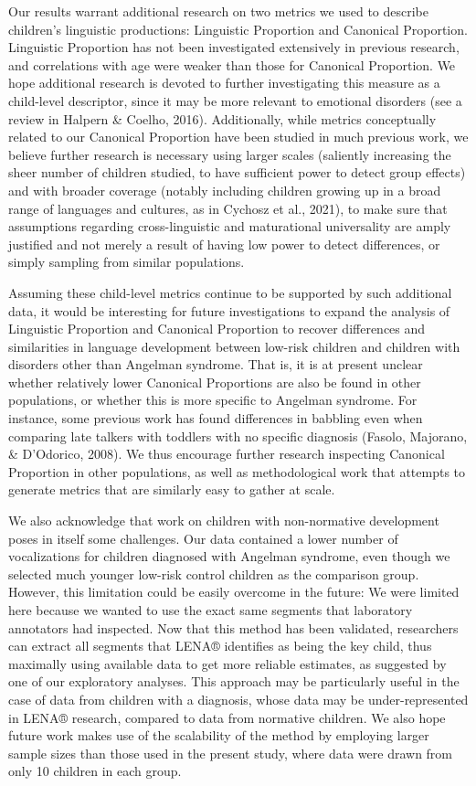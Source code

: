 \documentclass[
  english,
  ,man]{apa6}
\begin{document}
Our results warrant additional research on two metrics we used to describe children's linguistic productions: Linguistic Proportion and Canonical Proportion. Linguistic Proportion has not been investigated extensively in previous research, and correlations with age were weaker than those for Canonical Proportion. We hope additional research is devoted to further investigating this measure as a child-level descriptor, since it may be more relevant to emotional disorders (see a review in Halpern \& Coelho, 2016). Additionally, while metrics conceptually related to our Canonical Proportion have been studied in much previous work, we believe further research is necessary using larger scales (saliently increasing the sheer number of children studied, to have sufficient power to detect group effects) and with broader coverage (notably including children growing up in a broad range of languages and cultures, as in Cychosz et al., 2021), to make sure that assumptions regarding cross-linguistic and maturational universality are amply justified and not merely a result of having low power to detect differences, or simply sampling from similar populations.

Assuming these child-level metrics continue to be supported by such additional data, it would be interesting for future investigations to expand the analysis of Linguistic Proportion and Canonical Proportion to recover differences and similarities in language development between low-risk children and children with disorders other than Angelman syndrome. That is, it is at present unclear whether relatively lower Canonical Proportions are also be found in other populations, or whether this is more specific to Angelman syndrome. For instance, some previous work has found differences in babbling even when comparing late talkers with toddlers with no specific diagnosis (Fasolo, Majorano, \& D'Odorico, 2008). We thus encourage further research inspecting Canonical Proportion in other populations, as well as methodological work that attempts to generate metrics that are similarly easy to gather at scale.

We also acknowledge that work on children with non-normative development poses in itself some challenges. Our data contained a lower number of vocalizations for children diagnosed with Angelman syndrome, even though we selected much younger low-risk control children as the comparison group. However, this limitation could be easily overcome in the future: We were limited here because we wanted to use the exact same segments that laboratory annotators had inspected. Now that this method has been validated, researchers can extract all segments that LENA® identifies as being the key child, thus maximally using available data to get more reliable estimates, as suggested by one of our exploratory analyses. This approach may be particularly useful in the case of data from children with a diagnosis, whose data may be under-represented in LENA® research, compared to data from normative children. We also hope future work makes use of the scalability of the method by employing larger sample sizes than those used in the present study, where data were drawn from only 10 children in each group.
\end{document}

